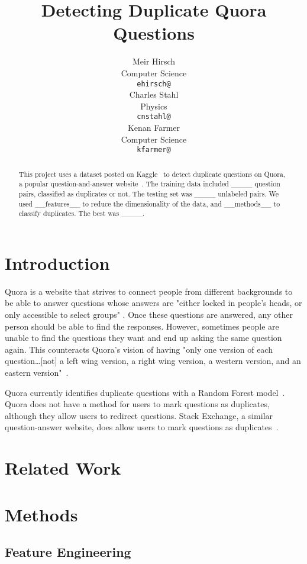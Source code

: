 \documentclass{article} %
\title{Detecting Duplicate Quora Questions}
\author{
Meir Hirsch \\
Computer Science\\
\texttt{ehirsch@} \\
\And
Charles Stahl \\
Physics \\
\texttt{cnstahl@} \\
\And
Kenan Farmer\\
Computer Science \\
\texttt{kfarmer@}\\
}
\begin{document}
\maketitle

\begin{abstract}
This project uses a dataset posted on Kaggle~\cite{kaggleComp} to detect duplicate questions on Quora, a popular question-and-answer website~\cite{quora}. The training data included \_\_\_\_ question pairs, classified as duplicates or not. The testing set was \_\_\_\_ unlabeled pairs. We used \_\_features\_\_ to reduce the dimensionality of the data, and \_\_methods\_\_ to classify duplicates. The best was \_\_\_\_.
\end{abstract}

\section{Introduction}

Quora is a website that strives to connect people from different backgrounds to be able to answer questions whose answers are "either locked in people’s heads, or only accessible to select groups" \cite{quora}. Once these questions are answered, any other person should be able to find the responses. However, sometimes people are unable to find the questions they want and end up asking the same question again. This counteracts Quora's vision of having "only one version of each question\dots [not] a left wing version, a right wing version, a western version, and an eastern version"~\cite{quora}. 

Quora currently identifies duplicate questions with a Random Forest model~\cite{kaggleComp}. Quora does not have a method for users to mark questions as duplicates, although they allow users to redirect questions. Stack Exchange, a similar question-answer website, does allow users to mark questions as duplicates~\cite{stackdup}.



\section{Related Work}

\section{Methods}

\subsection{Feature Engineering}
\end{document}
